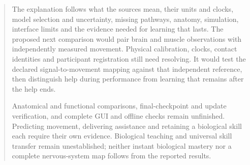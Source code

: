 \documentclass[11pt,a4paper]{article}
\renewcommand{\_}{\char95\relax}
\begin{document}
\begin{abstract}
The explanation follows what the sources mean, their units and clocks, model selection and uncertainty, missing pathways, anatomy, simulation, interface limits and the evidence needed for learning that lasts. The proposed next comparison would pair brain and muscle observations with independently measured movement. Physical calibration, clocks, contact identities and participant registration still need resolving. It would test the declared signal-to-movement mapping against that independent reference, then distinguish help during performance from learning that remains after the help ends.

Anatomical and functional comparisons, final-checkpoint and update verification, and complete GUI and offline checks remain unfinished. Predicting movement, delivering assistance and retaining a biological skill each require their own evidence. Biological teaching and universal skill transfer remain unestablished; neither instant biological mastery nor a complete nervous-system map follows from the reported results.
\end{abstract}
\tableofcontents\clearpage



\clearpage

\par

\begingroup
\let\NTlayoutOriginalBibitem\bibitem
\def\NTlayoutBalanceKey{tsai2019}
\renewcommand{\bibitem}[2][]{%
  \clubpenalty=10000\widowpenalty=10000\displaywidowpenalty=10000
  \def\NTlayoutCurrentKey{#2}%
  \ifx\NTlayoutCurrentKey\NTlayoutBalanceKey
    \par\newpage
  \fi
  \NTlayoutOriginalBibitem[#1]{#2}%
}

\endgroup
\clearpage
\appendix

\end{document}
